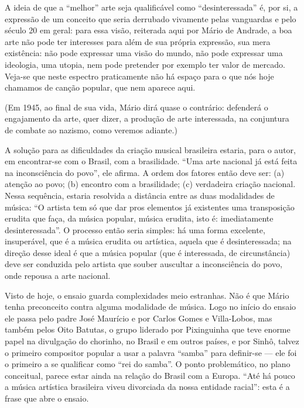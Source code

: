 A ideia de que a ``melhor'' arte seja qualificável como
``desinteressada'' é, por si, a expressão de um conceito que seria
derrubado vivamente pelas vanguardas e pelo século 20 em geral: para
essa visão, reiterada aqui por Mário de Andrade, a boa arte não pode ter
interesses para além de sua própria expressão, sua mera existência: não
pode expressar uma visão do mundo, não pode expressar uma ideologia, uma
utopia, nem pode pretender por exemplo ter valor de mercado. Veja-se que
neste espectro praticamente não há espaço para o que nós hoje chamamos
de canção popular, que nem aparece aqui.

(Em 1945, ao final de sua vida, Mário dirá quase o contrário: defenderá
o engajamento da arte, quer dizer, a produção de arte interessada, na
conjuntura de combate ao nazismo, como veremos adiante.)

A solução para as dificuldades da criação musical brasileira estaria,
para o autor, em encontrar-se com o Brasil, com a brasilidade. ``Uma
arte nacional já está feita na inconsciência do povo'', ele afirma. A
ordem dos fatores então deve ser: (a) atenção ao povo; (b) encontro com
a brasilidade; (c) verdadeira criação nacional. Nessa sequência, estaria
resolvida a distância entre as duas modalidades de música: ``O artista
tem só que dar pros elementos já existentes uma transposição erudita que
faça, da música popular, música erudita, isto é: imediatamente
desinteressada''. O processo então seria simples: há uma forma
excelente, insuperável, que é a música erudita ou artística, aquela que
é desinteressada; na direção desse ideal é que a música popular (que é
interessada, de circunstância) deve ser conduzida pelo artista que
souber auscultar a inconsciência do povo, onde repousa a arte nacional.

Visto de hoje, o ensaio guarda complexidades meio estranhas. Não é que
Mário tenha preconceito contra alguma modalidade de música. Logo no
início do ensaio ele passa pelo padre José Maurício e por Carlos Gomes e
Villa-Lobos, mas também pelos Oito Batutas, o grupo liderado por
Pixinguinha que teve enorme papel na divulgação do chorinho, no Brasil e
em outros países, e por Sinhô, talvez o primeiro compositor popular a
usar a palavra ``samba'' para definir-se --- ele foi o primeiro a se
qualificar como ``rei do samba''. O ponto problemático, no plano
conceitual, parece estar ainda na relação do Brasil com a Europa. ``Até
há pouco a música artística brasileira viveu divorciada da nossa
entidade racial'': esta é a frase que abre o ensaio.

